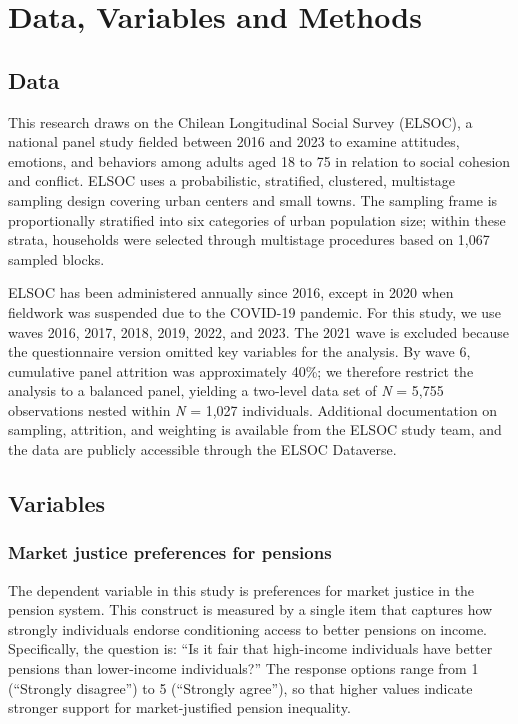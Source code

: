 \documentclass[
  12pt,
]{article}
\begin{document}
\section{Data, Variables and Methods}\label{data-variables-and-methods}

\subsection{Data}\label{data}

This research draws on the Chilean Longitudinal Social Survey (ELSOC), a
national panel study fielded between 2016 and 2023 to examine attitudes,
emotions, and behaviors among adults aged 18 to 75 in relation to social
cohesion and conflict. ELSOC uses a probabilistic, stratified,
clustered, multistage sampling design covering urban centers and small
towns. The sampling frame is proportionally stratified into six
categories of urban population size; within these strata, households
were selected through multistage procedures based on 1,067 sampled
blocks.

ELSOC has been administered annually since 2016, except in 2020 when
fieldwork was suspended due to the COVID-19 pandemic. For this study, we
use waves 2016, 2017, 2018, 2019, 2022, and 2023. The 2021 wave is
excluded because the questionnaire version omitted key variables for the
analysis. By wave 6, cumulative panel attrition was approximately 40\%;
we therefore restrict the analysis to a balanced panel, yielding a
two-level data set of \emph{N} = 5,755 observations nested within
\emph{N} = 1,027 individuals. Additional documentation on sampling,
attrition, and weighting is available from the ELSOC study team, and the
data are publicly accessible through the ELSOC Dataverse.

\subsection{Variables}\label{variables}

\subsubsection{Market justice preferences for
pensions}\label{market-justice-preferences-for-pensions}

The dependent variable in this study is preferences for market justice
in the pension system. This construct is measured by a single item that
captures how strongly individuals endorse conditioning access to better
pensions on income. Specifically, the question is: ``Is it fair that
high-income individuals have better pensions than lower-income
individuals?'' The response options range from 1 (``Strongly disagree'')
to 5 (``Strongly agree''), so that higher values indicate stronger
support for market-justified pension inequality.
\end{document}
